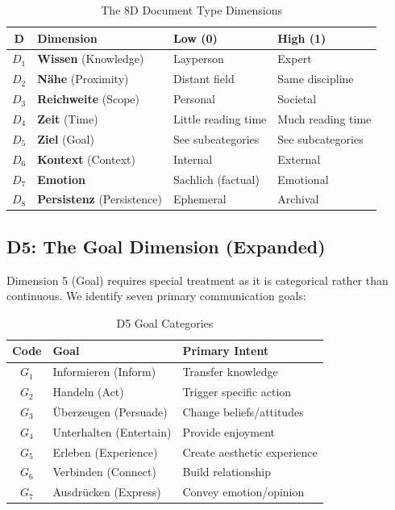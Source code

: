 \begin{table}[htbp]
\centering
\caption{The 8D Document Type Dimensions}
\label{tab:8d-dimensions}
\renewcommand{\arraystretch}{1.4}
\begin{tabular}{@{}clll@{}}
\toprule
\textbf{D} & \textbf{Dimension} & \textbf{Low (0)} & \textbf{High (1)} \\
\midrule
$D_1$ & \textbf{Wissen} (Knowledge) & Layperson & Expert \\
$D_2$ & \textbf{N\"ahe} (Proximity) & Distant field & Same discipline \\
$D_3$ & \textbf{Reichweite} (Scope) & Personal & Societal \\
$D_4$ & \textbf{Zeit} (Time) & Little reading time & Much reading time \\
$D_5$ & \textbf{Ziel} (Goal) & See subcategories & See subcategories \\
$D_6$ & \textbf{Kontext} (Context) & Internal & External \\
$D_7$ & \textbf{Emotion} & Sachlich (factual) & Emotional \\
$D_8$ & \textbf{Persistenz} (Persistence) & Ephemeral & Archival \\
\bottomrule
\end{tabular}
\end{table}

\subsection{D5: The Goal Dimension (Expanded)}

Dimension 5 (Goal) requires special treatment as it is categorical rather than
continuous. We identify seven primary communication goals:

\begin{table}[htbp]
\centering
\caption{D5 Goal Categories}
\label{tab:d5-goals}
\renewcommand{\arraystretch}{1.3}
\begin{tabular}{@{}cll@{}}
\toprule
\textbf{Code} & \textbf{Goal} & \textbf{Primary Intent} \\
\midrule
$G_1$ & Informieren (Inform) & Transfer knowledge \\
$G_2$ & Handeln (Act) & Trigger specific action \\
$G_3$ & \"Uberzeugen (Persuade) & Change beliefs/attitudes \\
$G_4$ & Unterhalten (Entertain) & Provide enjoyment \\
$G_5$ & Erleben (Experience) & Create aesthetic experience \\
$G_6$ & Verbinden (Connect) & Build relationship \\
$G_7$ & Ausdr\"ucken (Express) & Convey emotion/opinion \\
\bottomrule
\end{tabular}
\end{table}


